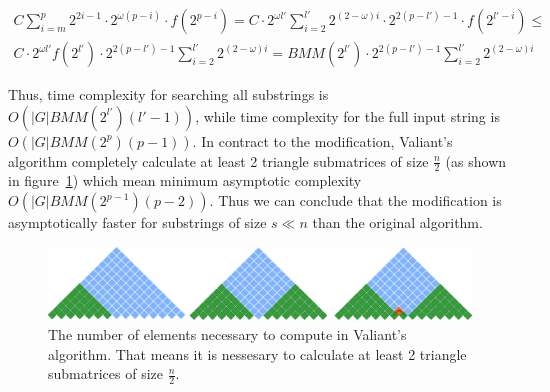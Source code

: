 \begin{equation}
\begin{array}{c}
C \sum\limits_{i=m}^p 2^{2i - 1} \cdot 2^{\omega(p - i)} \cdot f(2^{p - i}) =
C \cdot 2^{\omega l'}\sum\limits_{i=2}^{l'} 2^{(2 - \omega)i} \cdot 2^{2(p - l') - 1} \cdot f(2^{l' - i}) \le \\
C \cdot 2^{\omega l'} f(2^{l'}) \cdot 2^{2(p - l') - 1} \sum\limits_{i=2}^{l'} 2^{(2 - \omega)i} =
BMM(2^{l'}) \cdot 2^{2(p - l') - 1} \sum\limits_{i=2}^{l'} 2^{(2 - \omega)i}
\end{array}
\end{equation}

Thus, time complexity for searching all substrings is  $O(|G|BMM(2^{l'})(l' - 1))$, while time complexity for the full input string is $O(|G|BMM(2^p)(p - 1))$. In contract to the modification, Valiant's algorithm completely calculate at least 2 triangle submatrices of size $\frac{n}{2}$ (as shown in figure~\ref{fig5}) which mean minimum asymptotic complexity  $O(|G|BMM(2^{p - 1})(p - 2))$. Thus we can conclude that the modification is asymptotically faster for substrings of size $s \ll n$  than the original algorithm.

\begin{figure}[h]
\vspace{3mm}
 \begin{center}
 \includegraphics[width=12cm]{pictures/valsubstring.pdf}
    \caption{The number of elements necessary to compute in Valiant's algorithm. That means it is nessesary to calculate at least 2 triangle submatrices of size $\frac{n}{2}$.}
    \label{fig5}
 \end{center}
\vspace{-8mm}
\end{figure}
